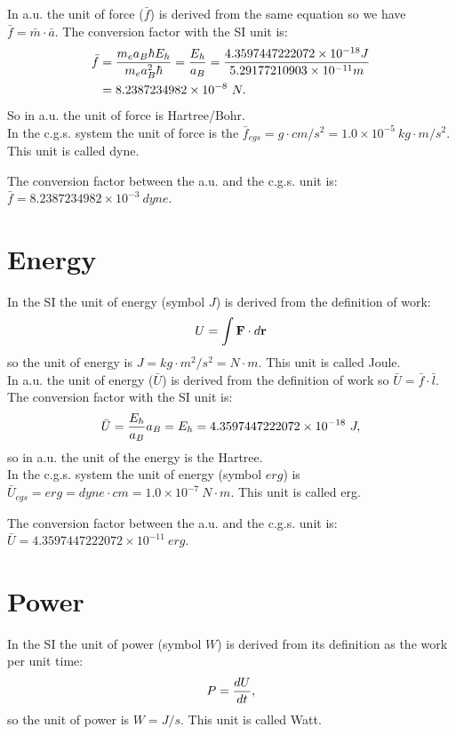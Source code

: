 \documentclass[12pt,a4paper]{article}
\def\barl{5.29177210903\times 10^{-11}}
\def\barf{8.2387234982\times 10^{-8}}
\def\baru{4.3597447222072\times 10^{-18}}
\def\ftof{1.0\times 10^{-5}}
\def\utou{1.0\times 10^{-7}}
\def\barfcgs{8.2387234982\times 10^{-3}}
\def\barucgs{4.3597447222072\times 10^{-11}}
\begin{document}
{\color{web-blue} In a.u. the unit of force ($\bar f$) is derived 
from the same equation so we have $\bar f =\bar m \cdot \bar a$. The
conversion factor with the SI unit is: 
\begin{align}
\bar f &= {m_e a_B \hbar E_h \over m_e a_B^2 \hbar }= 
{E_h\over a_B}\nonumber={\baru J \over \barl m}\nonumber \\
&=\barf\ N. 
\end{align}
So in a.u. the unit of force is Hartree/Bohr.
}
\\

{\color{orange} In the c.g.s. system the unit of force is the 
$\bar f_{cgs}=g\cdot cm/s^2 = \ftof\ kg\cdot m/s^2$. This unit is 
called dyne.
\\
}

{\color{green} The conversion factor between the a.u. and the c.g.s. unit is:
$\bar f=\barfcgs\ dyne$.
\\
}
\newpage

\section{\color{coral}Energy}
In the SI the unit of energy (symbol $J$) is derived from the 
definition of work: 
\begin{equation}
U= \int {\bf F} \cdot d{\bf r}
\end{equation} 
so the unit of energy is $J=kg\cdot m^2/s^2=N\cdot m$. This unit is 
called Joule.
\\

{\color{web-blue} In a.u. the unit of energy ($\bar U$) is derived 
from the definition of work so $\bar U =\bar f \cdot \bar l$. The 
conversion factor with the SI unit is: 
\begin{equation}
\bar U = {E_h\over a_B} a_B=E_h=\baru\ J, 
\end{equation}
so in a.u. the unit of the energy is the Hartree.
}
\\

{\color{orange} In the c.g.s. system the unit of energy (symbol $erg$)
is $\bar U_{cgs}=erg=dyne\cdot cm = \utou\ N\cdot m$. This unit is 
called erg.
\\
}

{\color{green} The conversion factor between the a.u. and the c.g.s. unit is:
$\bar U=\barucgs\ erg$.
\\
}

\newpage
\section{\color{coral}Power}
In the SI the unit of power (symbol $W$) is derived from its
definition as the work per unit time: 
\begin{equation}
P= {d U \over d t},
\end{equation} 
so the unit of power is $W=J/s$. This unit is called Watt.
\\
\end{document}
